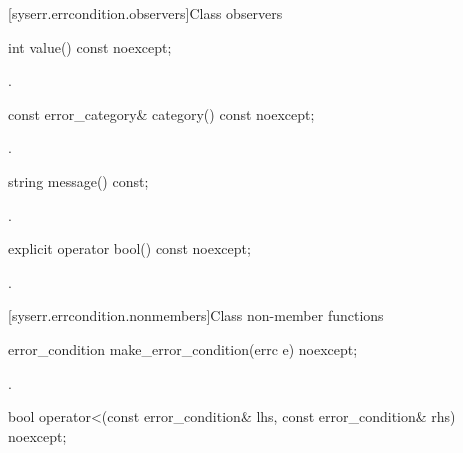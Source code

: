 [syserr.errcondition.observers]{Class  observers}

%
\begin{itemdecl}
int value() const noexcept;
\end{itemdecl}

\begin{itemdescr}
\pnum
\returns {}.
\end{itemdescr}

%
\begin{itemdecl}
const error_category& category() const noexcept;
\end{itemdecl}

\begin{itemdescr}
\pnum
\returns {}.
\end{itemdescr}

%
\begin{itemdecl}
string message() const;
\end{itemdecl}

\begin{itemdescr}
\pnum
\returns {}.
\end{itemdescr}

%
\begin{itemdecl}
explicit operator bool() const noexcept;
\end{itemdecl}

\begin{itemdescr}
\pnum
\returns {}.
\end{itemdescr}

[syserr.errcondition.nonmembers]{Class  non-member functions}

%
\begin{itemdecl}
error_condition make_error_condition(errc e) noexcept;
\end{itemdecl}

\begin{itemdescr}
\returns {}.
\end{itemdescr}

%
\begin{itemdecl}
bool operator<(const error_condition& lhs, const error_condition& rhs) noexcept;
\end{itemdecl}

